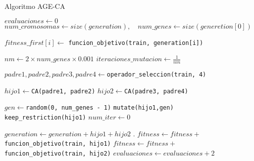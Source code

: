 \begin{algorithm}[H]
	\caption{Algoritmo AGE-CA}
	\fontsize{8}{10pt}\selectfont
	\label{alg:ageca}
	\begin{algorithmic}[1]
		\State $evaluaciones \gets 0$
		\State $num\_cromosomas \gets size(generation), \quad num\_genes \gets size(generetion[0])$
		
		\vspace{0.2cm}	
		
		\State$fitness\_first[i] \gets$ \texttt{funcion\_objetivo(train, generation[i])}
		\EndFor
		
		\vspace{0.2cm}			
		
		\State $nm \gets 2 \times num\_genes \times 0.001$
		\State $iteraciones\_mutacion \gets \frac{1}{nm}$
		
		\vspace{0.2cm}	
		
		\vspace{0.2cm}	
		\State $padre1, padre2, padre3, padre4 \gets$\texttt{operador\_seleccion(train, 4)}
		\vspace{0.2cm}	
		
		\State $hijo1 \gets$\texttt{CA(padre1, padre2)}
		\State $hijo2 \gets$\texttt{CA(padre3, padre4)}
		
		\vspace{0.2cm}	
		
		\State $gen \gets$\texttt{random(0, num\_genes - 1)}
		\State \texttt{mutate(hijo1,gen)} 
		\State \texttt{keep\_restriction(hijo1)}
		\State $num\_iter \gets 0$
		
		\EndIf
		
		\vspace{0.2cm}	
		
		\State $generation \gets generation + hijo1+ hijo2$ . 
		\State $fitness \gets fitness +$\texttt{funcion\_objetivo(train, hijo1)} 
		\State $fitness \gets fitness +$\texttt{funcion\_objetivo(train, hijo2)} 
		\State $evaluaciones \gets evaluaciones + 2$
		
		
		\vspace{0.2cm}	
		

\end{algorithmic}
\end{algorithm}

